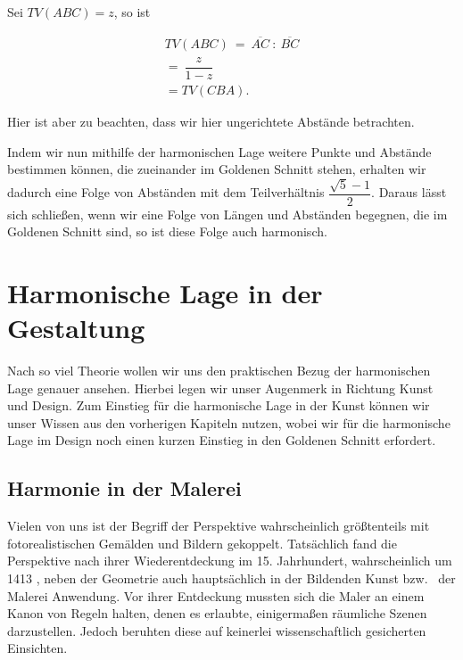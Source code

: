 \documentclass[12pt,a4paper]{article}
\begin{document}
Sei $TV(A B C) = z$, so ist

\begin{equation*}
\begin{split}
TV(A B C)~=~\overline{A C}~:~\overline{B C}\\
=~\dfrac{z}{1-z}~~~~~~\\
=TV(C B A).
\end{split}
\end{equation*}

Hier ist aber zu beachten, dass wir hier ungerichtete Abstände betrachten.

Indem wir nun mithilfe der harmonischen Lage weitere Punkte und Abstände bestimmen können, die zueinander im Goldenen Schnitt stehen, erhalten wir dadurch eine Folge von Abständen mit dem Teilverhältnis $\dfrac{\sqrt{5}-1}{2}$. Daraus lässt sich schließen, wenn wir eine Folge von Längen und Abständen begegnen, die im Goldenen Schnitt sind, so ist diese Folge auch harmonisch.


\newpage
\section{Harmonische Lage in der Gestaltung}

Nach so viel Theorie wollen wir uns den praktischen Bezug der harmonischen Lage genauer ansehen. Hierbei legen wir unser Augenmerk in Richtung Kunst und Design. Zum Einstieg für die harmonische Lage in der Kunst können wir unser Wissen aus den vorherigen Kapiteln nutzen, wobei wir für die harmonische Lage im Design noch einen kurzen Einstieg in den Goldenen Schnitt erfordert.

\subsection{Harmonie in der Malerei}

Vielen von uns ist der Begriff der Perspektive wahrscheinlich größtenteils mit fotorealistischen Gemälden und Bildern gekoppelt. Tatsächlich fand die Perspektive nach ihrer Wiederentdeckung im 15. Jahrhundert, wahrscheinlich um 1413 \citep[S.~27]{perspektive}, neben der Geometrie auch hauptsächlich in der Bildenden Kunst bzw.~ der Malerei Anwendung. Vor ihrer Entdeckung mussten sich die Maler an einem Kanon von Regeln halten, denen es erlaubte, einigermaßen räumliche Szenen darzustellen. Jedoch beruhten diese auf keinerlei wissenschaftlich gesicherten Einsichten.
\end{document}
